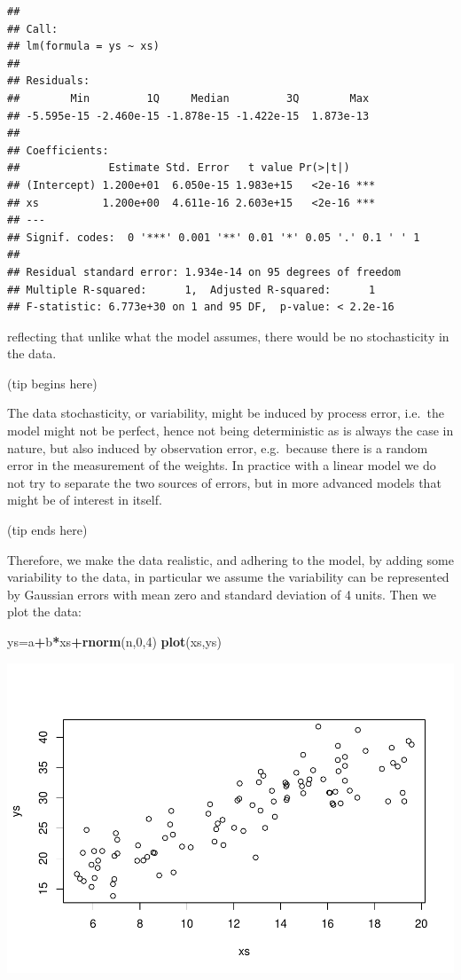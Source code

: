 \documentclass[
]{book}
\newenvironment{Shaded}{\begin{snugshade}}{\end{snugshade}}
\newcommand{\DecValTok}[1]{\textcolor[rgb]{0.00,0.00,0.81}{#1}}
\newcommand{\FunctionTok}[1]{\textcolor[rgb]{0.13,0.29,0.53}{\textbf{#1}}}
\newcommand{\NormalTok}[1]{#1}
\newcommand{\OtherTok}[1]{\textcolor[rgb]{0.56,0.35,0.01}{#1}}
\newcommand{\SpecialCharTok}[1]{\textcolor[rgb]{0.81,0.36,0.00}{\textbf{#1}}}
\begin{document}
\begin{verbatim}
## 
## Call:
## lm(formula = ys ~ xs)
## 
## Residuals:
##        Min         1Q     Median         3Q        Max 
## -5.595e-15 -2.460e-15 -1.878e-15 -1.422e-15  1.873e-13 
## 
## Coefficients:
##              Estimate Std. Error   t value Pr(>|t|)    
## (Intercept) 1.200e+01  6.050e-15 1.983e+15   <2e-16 ***
## xs          1.200e+00  4.611e-16 2.603e+15   <2e-16 ***
## ---
## Signif. codes:  0 '***' 0.001 '**' 0.01 '*' 0.05 '.' 0.1 ' ' 1
## 
## Residual standard error: 1.934e-14 on 95 degrees of freedom
## Multiple R-squared:      1,  Adjusted R-squared:      1 
## F-statistic: 6.773e+30 on 1 and 95 DF,  p-value: < 2.2e-16
\end{verbatim}

reflecting that unlike what the model assumes, there would be no stochasticity in the data.

(tip begins here)

The data stochasticity, or variability, might be induced by process error, i.e.~the model might not be perfect, hence not being deterministic as is always the case in nature, but also induced by observation error, e.g.~because there is a random error in the measurement of the weights. In practice with a linear model we do not try to separate the two sources of errors, but in more advanced models that might be of interest in itself.

(tip ends here)

Therefore, we make the data realistic, and adhering to the model, by adding some variability to the data, in particular we assume the variability can be represented by Gaussian errors with mean zero and standard deviation of 4 units. Then we plot the data:

\begin{Shaded}
\begin{Highlighting}[]
\NormalTok{ys}\OtherTok{=}\NormalTok{a}\SpecialCharTok{+}\NormalTok{b}\SpecialCharTok{*}\NormalTok{xs}\SpecialCharTok{+}\FunctionTok{rnorm}\NormalTok{(n,}\DecValTok{0}\NormalTok{,}\DecValTok{4}\NormalTok{)}
\FunctionTok{plot}\NormalTok{(xs,ys)}
\end{Highlighting}
\end{Shaded}

\includegraphics{ECOMODbook_files/figure-latex/a6.25-1.pdf}
\end{document}
